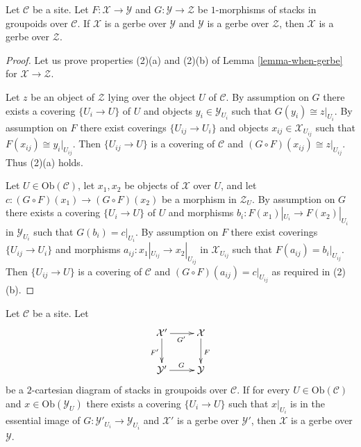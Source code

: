 \begin{lemma}
\label{lemma-composition-gerbe}
Let $\mathcal{C}$ be a site. Let
$F : \mathcal{X} \to \mathcal{Y}$ and $G : \mathcal{Y} \to \mathcal{Z}$
be $1$-morphisms of stacks in groupoids over $\mathcal{C}$.
If $\mathcal{X}$ is a gerbe over $\mathcal{Y}$ and
$\mathcal{Y}$ is a gerbe over $\mathcal{Z}$, then
$\mathcal{X}$ is a gerbe over $\mathcal{Z}$.
\end{lemma}

\begin{proof}
Let us prove properties (2)(a) and (2)(b) of
Lemma \ref{lemma-when-gerbe}
for $\mathcal{X} \to \mathcal{Z}$.

\medskip\noindent
Let $z$ be an object of $\mathcal{Z}$ lying over the object $U$
of $\mathcal{C}$. By assumption on $G$ there exists
a covering $\{U_i \to U\}$ of $U$ and objects
$y_i \in \mathcal{Y}_{U_i}$ such that $G(y_i) \cong z|_{U_i}$.
By assumption on $F$ there exist coverings $\{U_{ij} \to U_i\}$
and objects $x_{ij} \in \mathcal{X}_{U_{ij}}$ such that
$F(x_{ij}) \cong y_i|_{U_{ij}}$.
Then $\{U_{ij} \to U\}$ is a covering of $\mathcal{C}$
and $(G \circ F)(x_{ij}) \cong z|_{U_{ij}}$. Thus (2)(a) holds.

\medskip\noindent
Let $U \in \text{Ob}(\mathcal{C})$, let $x_1, x_2$ be objects of
$\mathcal{X}$ over $U$, and let
$c : (G \circ F)(x_1) \to (G \circ F)(x_2)$ be a morphism in
$\mathcal{Z}_U$. By assumption on $G$ there exists
a covering $\{U_i \to U\}$ of $U$ and morphisms
$b_i : F(x_1)|_{U_i} \to F(x_2)|_{U_i}$ in $\mathcal{Y}_{U_i}$
such that $G(b_i) = c|_{U_i}$.
By assumption on $F$ there exist coverings $\{U_{ij} \to U_i\}$
and morphisms $a_{ij} : x_1|_{U_{ij}} \to x_2|_{U_{ij}}$ in
$\mathcal{X}_{U_{ij}}$ such that $F(a_{ij}) = b_i|_{U_{ij}}$.
Then $\{U_{ij} \to U\}$ is a covering of $\mathcal{C}$
and $(G \circ F)(a_{ij}) = c|_{U_{ij}}$ as required in (2)(b).
\end{proof}

\begin{lemma}
\label{lemma-gerbe-descent}
Let $\mathcal{C}$ be a site. Let
$$
\xymatrix{
\mathcal{X}' \ar[r]_{G'} \ar[d]_{F'} & \mathcal{X} \ar[d]^F \\
\mathcal{Y}' \ar[r]^G & \mathcal{Y}
}
$$
be a $2$-cartesian diagram of stacks in groupoids over $\mathcal{C}$.
If for every $U \in \text{Ob}(\mathcal{C})$ and
$x \in \text{Ob}(\mathcal{Y}_U)$ there exists a covering
$\{U_i \to U\}$ such that $x|_{U_i}$ is in the essential
image of $G : \mathcal{Y}'_{U_i} \to \mathcal{Y}_{U_i}$ and
$\mathcal{X}'$ is a gerbe over $\mathcal{Y}'$, then
$\mathcal{X}$ is a gerbe over $\mathcal{Y}$.
\end{lemma}

